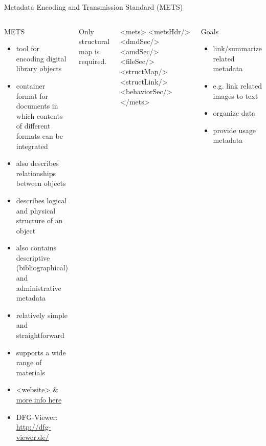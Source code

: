 
\begin{frame}[fragile]{Metadata Encoding and Transmission Standard (METS)}
\begin{columns}
\begin{block}{METS}\footnotesize
\begin{itemize}
\item tool for encoding digital library objects
\item container format for documents in which contents of different formats can be integrated 
\item also describes relationships between objects
\item describes logical and physical structure of an object
\item also contains descriptive (bibliographical) and administrative metadata
\item relatively simple and straightforward
\item supports a wide range of materials 
\item \href{https://www.loc.gov/standards/mets/mets-present.html}{<website>} \& \href{https://www.loc.gov/standards/mets/presentations/METS.ppt}{more info here}
\item DFG-Viewer: \protect\url{http://dfg-viewer.de/}
\end{itemize}
\end{block}
\small 
Only structural map is required.
\begin{xmlcode}
<mets>
  <metsHdr/>
  <dmdSec/>
  <amdSec/>
  <fileSec/>
  <structMap/>
  <structLink/>
  <behaviorSec/>
</mets>
\end{xmlcode}


\begin{block}{Goals}
\begin{itemize}\scriptsize
    \item link/summarize related metadata
    \item e.g. link related images to text
    \item organize data
    \item provide usage metadata
\end{itemize}
\end{block}

\end{columns}
\end{frame}


